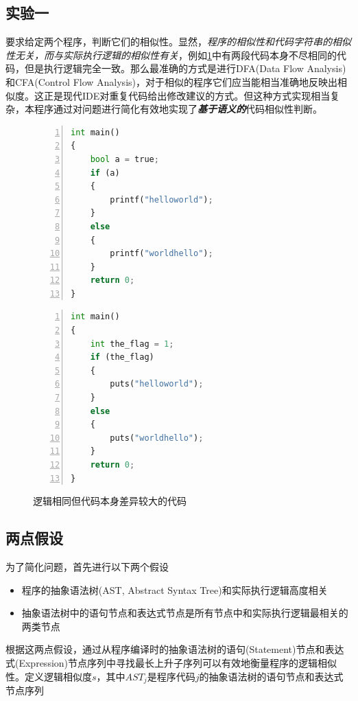 \documentclass[a4paper,twoside]{article}
\begin{document}
\begin{spacing}{1.2}
\newpage

\section{实验一}

要求给定两个程序，判断它们的相似性。显然，\emph{程序的相似性和代码字符串的相似性无关，而与实际执行逻辑的相似性有关}，例如\ref{fig:dupcode}中有两段代码本身不尽相同的代码，但是执行逻辑完全一致。那么最准确的方式是进行DFA(Data Flow Analysis)和CFA(Control Flow Analysis)，对于相似的程序它们应当能相当准确地反映出相似度。这正是现代IDE对重复代码给出修改建议的方式。但这种方式实现相当复杂，本程序通过对问题进行简化有效地实现了\emph{\textbf{基于语义的}}代码相似性判断。

\begin{figure}[htbp]
\caption{逻辑相同但代码本身差异较大的代码}
\label{fig:dupcode}
\begin{minipage}{0.48\textwidth}
\begin{lstlisting}[language=Python,numbers=left,style=PythonStyle,label={code:dupexample1}]
int main()
{
	bool a = true;
	if (a)
	{
		printf("helloworld");
	}
	else
	{
		printf("worldhello");
	}
	return 0;
}
\end{lstlisting}
\end{minipage}
\begin{minipage}{0.48\textwidth}
\begin{lstlisting}[language=Python,numbers=left,style=PythonStyle,label={code:dupexample2}]
int main()
{
	int the_flag = 1;
	if (the_flag)
	{
		puts("helloworld");
	}
	else
	{
		puts("worldhello");
	}
	return 0;
}
\end{lstlisting}
\end{minipage}
\end{figure}

\subsection{两点假设}
为了简化问题，首先进行以下两个假设

\begin{itemize}
	\item 程序的抽象语法树(AST, Abstract Syntax Tree)和实际执行逻辑高度相关
	\item 抽象语法树中的语句节点和表达式节点是所有节点中和实际执行逻辑最相关的两类节点
\end{itemize}

根据这两点假设，通过从程序编译时的抽象语法树的语句(Statement)节点和表达式(Expression)节点序列中寻找最长上升子序列可以有效地衡量程序的逻辑相似性。定义逻辑相似度$s$，其中$AST_j$是程序代码$j$的抽象语法树的语句节点和表达式节点序列


\end{spacing}
\end{document}
